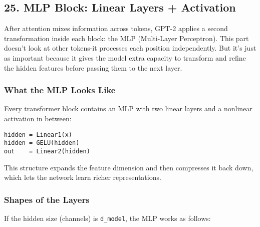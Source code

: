 \documentclass[
  letterpaper,
  DIV=11,
  numbers=noendperiod]{scrreprt}
\begin{document}
\subsection{25. MLP Block: Linear Layers +
Activation}\label{mlp-block-linear-layers-activation}

After attention mixes information across tokens, GPT-2 applies a second
transformation inside each block: the MLP (Multi-Layer Perceptron). This
part doesn't look at other tokens-it processes each position
independently. But it's just as important because it gives the model
extra capacity to transform and refine the hidden features before
passing them to the next layer.

\subsubsection{What the MLP Looks Like}\label{what-the-mlp-looks-like}

Every transformer block contains an MLP with two linear layers and a
nonlinear activation in between:

\begin{verbatim}
hidden = Linear1(x)
hidden = GELU(hidden)
out    = Linear2(hidden)
\end{verbatim}

This structure expands the feature dimension and then compresses it back
down, which lets the network learn richer representations.

\subsubsection{Shapes of the Layers}\label{shapes-of-the-layers}

If the hidden size (channels) is \texttt{d\_model}, the MLP works as
follows:
\end{document}

